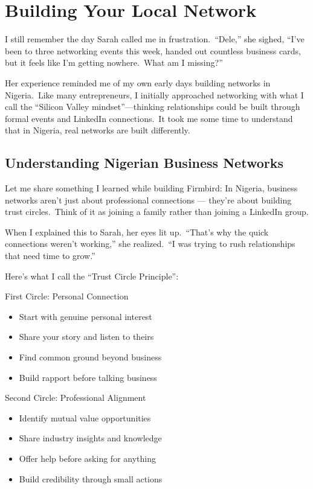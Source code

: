 \chapter{Building Your Local Network}\label{ch:building-your-local-network}

I still remember the day Sarah called me in frustration.\ ``Dele,'' she sighed, ``I've been to three networking events this week, handed out countless business cards, but it feels like I'm getting nowhere.\ What am I missing?''

Her experience reminded me of my own early days building networks in Nigeria.\ Like many entrepreneurs, I initially approached networking with what I call the ``Silicon Valley mindset''—thinking relationships could be built through formal events and LinkedIn connections.\ It took me some time to understand that in Nigeria, real networks are built differently.

\section{Understanding Nigerian Business Networks}\label{sec:understanding-networks}

Let me share something I learned while building Firmbird: In Nigeria, business networks aren't just about professional connections --- they're about building trust circles.\ Think of it as joining a family rather than joining a LinkedIn group.

When I explained this to Sarah, her eyes lit up.\ ``That's why the quick connections weren't working,'' she realized.\ ``I was trying to rush relationships that need time to grow.''

Here's what I call the ``Trust Circle Principle'':

First Circle: Personal Connection
\begin{itemize}
    \item Start with genuine personal interest
    \item Share your story and listen to theirs
    \item Find common ground beyond business
    \item Build rapport before talking business
\end{itemize}

Second Circle: Professional Alignment
\begin{itemize}
    \item Identify mutual value opportunities
    \item Share industry insights and knowledge
    \item Offer help before asking for anything
    \item Build credibility through small actions
\end{itemize}

